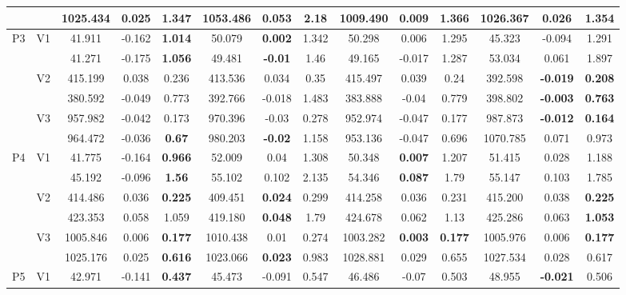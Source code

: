 \documentclass[12pt,a4paper]{article}
\begin{document}
\begin{sidewaystable}[ht]
{\begin{tabular}{cc|ccc|ccc|ccc|ccc|}
   &  & 1025.434 & 0.025 & \textbf{1.347} & 1053.486 & 0.053 & 2.18 & 1009.490 & \textbf{0.009} & 1.366 & 1026.367 & 0.026 & 1.354 \\ 
   \hline \hline\multirow{6}{*}{P3} & \multirow{2}{*}{V1} & 41.911 & -0.162 & \textbf{1.014} & 50.079 & \textbf{0.002} & 1.342 & 50.298 & 0.006 & 1.295 & 45.323 & -0.094 & 1.291 \\ 
   &  & 41.271 & -0.175 & \textbf{1.056} & 49.481 & \textbf{-0.01} & 1.46 & 49.165 & -0.017 & 1.287 & 53.034 & 0.061 & 1.897 \\ 
   & \multirow{2}{*}{V2} & 415.199 & 0.038 & 0.236 & 413.536 & 0.034 & 0.35 & 415.497 & 0.039 & 0.24 & 392.598 & \textbf{-0.019} & \textbf{0.208} \\ 
   &  & 380.592 & -0.049 & 0.773 & 392.766 & -0.018 & 1.483 & 383.888 & -0.04 & 0.779 & 398.802 & \textbf{-0.003} & \textbf{0.763} \\ 
   & \multirow{2}{*}{V3} & 957.982 & -0.042 & 0.173 & 970.396 & -0.03 & 0.278 & 952.974 & -0.047 & 0.177 & 987.873 & \textbf{-0.012} & \textbf{0.164} \\ 
   &  & 964.472 & -0.036 & \textbf{0.67} & 980.203 & \textbf{-0.02} & 1.158 & 953.136 & -0.047 & 0.696 & 1070.785 & 0.071 & 0.973 \\ 
   \hline \hline\multirow{6}{*}{P4} & \multirow{2}{*}{V1} & 41.775 & -0.164 & \textbf{0.966} & 52.009 & 0.04 & 1.308 & 50.348 & \textbf{0.007} & 1.207 & 51.415 & 0.028 & 1.188 \\ 
   &  & 45.192 & -0.096 & \textbf{1.56} & 55.102 & 0.102 & 2.135 & 54.346 & \textbf{0.087} & 1.79 & 55.147 & 0.103 & 1.785 \\ 
   & \multirow{2}{*}{V2} & 414.486 & 0.036 & \textbf{0.225} & 409.451 & \textbf{0.024} & 0.299 & 414.258 & 0.036 & 0.231 & 415.200 & 0.038 & \textbf{0.225} \\ 
   &  & 423.353 & 0.058 & 1.059 & 419.180 & \textbf{0.048} & 1.79 & 424.678 & 0.062 & 1.13 & 425.286 & 0.063 & \textbf{1.053} \\ 
   & \multirow{2}{*}{V3} & 1005.846 & 0.006 & \textbf{0.177} & 1010.438 & 0.01 & 0.274 & 1003.282 & \textbf{0.003} & \textbf{0.177} & 1005.976 & 0.006 & \textbf{0.177} \\ 
   &  & 1025.176 & 0.025 & \textbf{0.616} & 1023.066 & \textbf{0.023} & 0.983 & 1028.881 & 0.029 & 0.655 & 1027.534 & 0.028 & 0.617 \\ 
   \hline \hline\multirow{6}{*}{P5} & \multirow{2}{*}{V1} & 42.971 & -0.141 & \textbf{0.437} & 45.473 & -0.091 & 0.547 & 46.486 & -0.07 & 0.503 & 48.955 & \textbf{-0.021} & 0.506 \\ 

\end{tabular}}
\end{sidewaystable}
\end{document}
